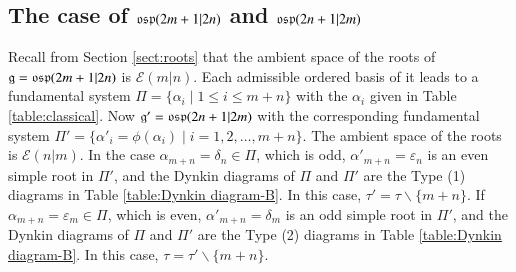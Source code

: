 \documentclass[12pt]{amsart}
\theoremstyle{definition}
\theoremstyle{remark}
\numberwithin{equation}{section}
\begin{document}
\subsection{The case of  ${{\rm\mathfrak{osp}}}(2m+1|2n)$ and ${{\rm\mathfrak{osp}}}(2n+1|2m)$ }\label{sect:osp}

Recall from Section \ref{sect:roots} that
the ambient space of the roots of ${{\mathfrak g}}={{\rm\mathfrak{osp}}}(2m+1|2n)$ is ${{\mathcal E}}(m|n)$.
Each admissible ordered basis of it leads to a fundamental system $\Pi=\{\alpha_i\mid 1\le i\le m+n\}$ with the $\alpha_i$ given in
Table \ref{table:classical}.
Now ${{\mathfrak g}}'={{\rm\mathfrak{osp}}}(2n+1|2m)$ with the corresponding fundamental system $\Pi'=\{\alpha'_i=\phi(\alpha_i)\mid i=1, 2, \dots, m+n\}$.
The ambient space of the roots is ${{\mathcal E}}(n|m)$. In the case $\alpha_{m+n}=\delta_{n}\in \Pi$, which is odd, $\alpha'_{m+n}=\varepsilon_n$ is an even simple root in $\Pi'$, and the
Dynkin diagrams of $\Pi$ and $\Pi'$ are the Type (1) diagrams in Table \ref{table:Dynkin diagram-B}. In this case,  $\tau'=\tau\backslash\{m+n\}$.   If $\alpha_{m+n}=\varepsilon_m\in\Pi$,
which is even,  $\alpha'_{m+n}=\delta_m$ is an odd simple root in $\Pi'$, and the
Dynkin diagrams of $\Pi$ and $\Pi'$ are the Type (2) diagrams in Table \ref{table:Dynkin diagram-B}.  In this case, $\tau=\tau'\backslash\{m+n\}$.
\end{document}
